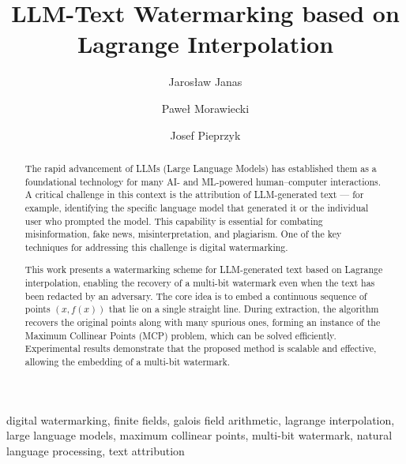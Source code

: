\documentclass[a4paper,11pt]{llncs}
\title{LLM-Text Watermarking based on Lagrange Interpolation}
\begin{document}
\pagestyle{headings}
\renewcommand{\labelitemi}{$\bullet$}
\author{
Jaros\l{}aw Janas \and
Pawe\l{} Morawiecki \and
Josef Pieprzyk
}
\maketitle

\begin{abstract}
The rapid advancement of LLMs (Large Language Models) has established them as a foundational technology for many AI- and ML-powered human–computer interactions. A critical challenge in this context is the attribution of LLM-generated text --- for example, identifying the specific language model that generated it or the individual user who prompted the model. This capability is essential for combating misinformation, fake news, misinterpretation, and plagiarism. One of the key techniques for addressing this challenge is digital watermarking. 

This work presents a watermarking scheme for LLM-generated text based on Lagrange interpolation, enabling the recovery of a multi-bit watermark even when the text has been redacted by an adversary. The core idea is to embed a continuous sequence of points $(x, f(x))$ that lie on a single straight line. During extraction, the algorithm recovers the original points along with many spurious ones, forming an instance of the Maximum Collinear Points (MCP) problem, which can be solved efficiently. Experimental results demonstrate that the proposed method is scalable and effective, allowing the embedding of a multi-bit watermark. 
\end{abstract}

\begin{keywords}
digital watermarking, finite fields, galois field arithmetic, lagrange interpolation, large language models, maximum collinear points, multi-bit watermark, natural language processing, text attribution
\end{keywords}

\end{document}
